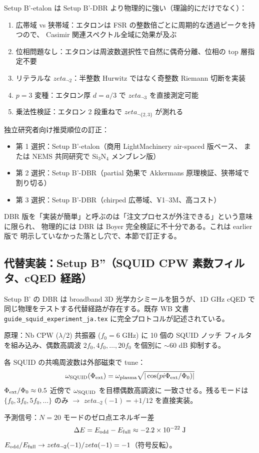 \documentclass[11pt,a4paper]{article}
\def\pi{pi}%
\def\zeta{zeta}%
\def\textbf#1{#1}%
\begin{document}
\textbf{Setup B'-etalon は Setup B'-DBR より物理的に強い}（理論的にだけでなく）：

\begin{enumerate}
\item \textbf{広帯域 vs 狭帯域}：エタロンは FSR の整数倍ごとに周期的な透過ピークを持つので、
  Casimir 関連スペクトル全域に効果が及ぶ
\item \textbf{位相問題なし}：エタロンは周波数選択性で自然に偶奇分離、位相の top 層指定不要
\item \textbf{リテラルな $\zeta_{\neg 2}$}：半整数 Hurwitz ではなく奇整数 Riemann 切断を実装
\item \textbf{$p=3$ 変種}：エタロン厚 $d = a/3$ で $\zeta_{\neg 3}$ を直接測定可能
\item \textbf{乗法性検証}：エタロン 2 段重ねで $\zeta_{\neg\{2,3\}}$ が測れる
\end{enumerate}

\textbf{独立研究者向け推奨順位の訂正}：
\begin{itemize}
\item \textbf{第 1 選択：Setup B'-etalon}（商用 LightMachinery air-spaced 版ベース、
  または NEMS 共同研究で Si$_3$N$_4$ メンブレン版）
\item 第 2 選択：Setup B'-DBR（partial 効果で Akkermans 原理検証、狭帯域で割り切る）
\item 第 3 選択：Setup B'-DBR（chirped 広帯域、¥1--3M、高コスト）
\end{itemize}

DBR 版を「実装が簡単」と呼ぶのは「注文プロセスが外注できる」という意味に限られ、
\textbf{物理的には DBR は Boyer 完全検証に不十分}である。これは earlier 版で
明示していなかった落とし穴で、本節で訂正する。

\subsection{代替実装：Setup B''（SQUID CPW 素数フィルタ、cQED 経路）}

Setup B' の DBR は broadband 3D 光学カシミールを狙うが、\textbf{1D GHz cQED で
同じ物理をテストする代替経路}が存在する。既存 WB 文書
\texttt{guide\_squid\_experiment\_ja.tex} に完全プロトコルが記述されている。

\begin{theorybox}
\textbf{原理}：Nb CPW ($\lambda/2$) 共振器 ($f_0 = 6$ GHz) に 10 個の SQUID ノッチ
フィルタを組み込み、偶数高調波 $2f_0, 4f_0, \ldots, 20f_0$ を個別に $\sim 60$ dB
抑制する。

各 SQUID の共鳴周波数は外部磁束で tune：
\[
  \omega_{\rm SQUID}(\Phi_{\rm ext}) = \omega_{\rm plasma}\sqrt{|\cos(\pi\Phi_{\rm ext}/\Phi_0)|}
\]
$\Phi_{\rm ext}/\Phi_0 \approx 0.5$ 近傍で $\omega_{\rm SQUID}$ を目標偶数高調波に
一致させる。残るモードは $\{f_0, 3f_0, 5f_0, \ldots\}$ のみ $\to$
$\zeta_{\neg 2}(-1) = +1/12$ を直接実装。

\textbf{予測信号}：$N=20$ モードのゼロ点エネルギー差
\[
  \Delta E = E_{\rm odd} - E_{\rm full} \approx -2.2\times 10^{-22}\;\text{J}
\]
$E_{\rm odd}/E_{\rm full} \to \zeta_{\neg 2}(-1)/\zeta(-1) = -1$（符号反転）。
\end{theorybox}
\end{document}
